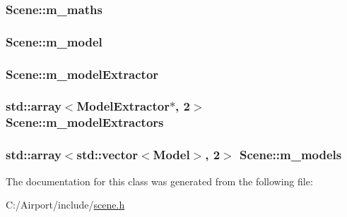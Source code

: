 \subsubsection[{\texorpdfstring{m\+\_\+maths}{m_maths}}]{ Scene\+::m\+\_\+maths\hspace{0.3cm}{\ttfamily [private]}}\hypertarget{class_scene_a64101e7e0ed72202c9898a5eddf28a7d}{}\label{class_scene_a64101e7e0ed72202c9898a5eddf28a7d}
\subsubsection[{\texorpdfstring{m\+\_\+model}{m_model}}]{ Scene\+::m\+\_\+model\hspace{0.3cm}{\ttfamily [private]}}\hypertarget{class_scene_a8398e5ee10d0a39903a26d665f3f3a9f}{}\label{class_scene_a8398e5ee10d0a39903a26d665f3f3a9f}
\subsubsection[{\texorpdfstring{m\+\_\+model\+Extractor}{m_modelExtractor}}]{ Scene\+::m\+\_\+model\+Extractor\hspace{0.3cm}{\ttfamily [private]}}\hypertarget{class_scene_aadd2050cd69c19889b146c6334feb8dd}{}\label{class_scene_aadd2050cd69c19889b146c6334feb8dd}
\subsubsection[{\texorpdfstring{m\+\_\+model\+Extractors}{m_modelExtractors}}]{\setlength{\rightskip}{0pt plus 5cm}std\+::array$<${\bf Model\+Extractor}$\ast$, 2$>$ Scene\+::m\+\_\+model\+Extractors\hspace{0.3cm}{\ttfamily [private]}}\hypertarget{class_scene_a023c55afb84b247b9c51f6d33131102c}{}\label{class_scene_a023c55afb84b247b9c51f6d33131102c}
\subsubsection[{\texorpdfstring{m\+\_\+models}{m_models}}]{\setlength{\rightskip}{0pt plus 5cm}std\+::array$<$std\+::vector$<${\bf Model}$>$, 2$>$ Scene\+::m\+\_\+models\hspace{0.3cm}{\ttfamily [private]}}\hypertarget{class_scene_a10335e874947752239a933d35d926c3b}{}\label{class_scene_a10335e874947752239a933d35d926c3b}


The documentation for this class was generated from the following file\+:\begin{DoxyCompactItemize}
\item 
C\+:/\+Airport/include/\hyperlink{scene_8h}{scene.\+h}\end{DoxyCompactItemize}

